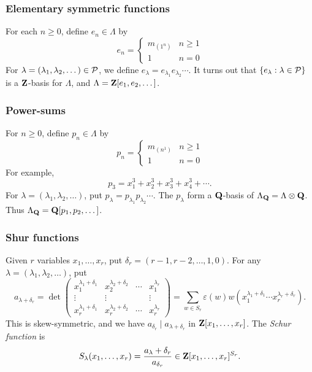 \subsubsection{Elementary symmetric functions}

For each $n\geqslant 0$, define $e_n\in \Lambda$ by 
\[
  e_n = \begin{cases} m_{(1^n)} & n\geqslant 1 \\ 1 & n=0 \end{cases} 
\] 
For $\lambda=(\lambda_1,\lambda_2,\dots)\in \mathcal{P}$, we define 
$e_\lambda = e_{\lambda_1} e_{\lambda_2} \cdots$. It turns out that 
$\{e_\lambda:\lambda\in \mathcal{P}\}$ is a $\mathbf{Z}$-basis for $\Lambda$, and 
$\Lambda=\mathbf{Z}[e_1,e_2,\dots]$. 


\subsubsection{Power-sums}

For $n\geqslant 0$, define $p_n\in \Lambda$ by 
\[
  p_n = \begin{cases} m_{(n^1)} & n\geqslant 1 \\ 1 & n=0 \end{cases}
\]
For example, 
\[
  p_3 = x_1^3 + x_2^3 + x_3^3 + x_4^3 + \cdots .
\]
For $\lambda=(\lambda_1,\lambda_2,\dots)$, put 
$p_\lambda = p_{\lambda_1} p_{\lambda_2} \dotsm$. The $p_\lambda$ form 
a $\mathbf{Q}$-basis of $\Lambda_{\mathbf{Q}} = \Lambda\otimes \mathbf{Q}$. Thus 
$\Lambda_{\mathbf{Q}}=\mathbf{Q}[p_1,p_2,\dots]$. 


\subsubsection{Shur functions}

Given $r$ variables $x_1,\dots,x_r$, put $\delta_r = (r-1,r-2,\dots,1,0)$. For 
any $\lambda=(\lambda_1,\lambda_2,\dots)$, put 
\[
  a_{\lambda+\delta_r} = \det
  \begin{pmatrix}
    x_1^{\lambda_1+\delta_1} & x_2^{\lambda_2 + \delta_2} & \cdots & x_1^{\lambda_r} \\ 
    \vdots & \vdots & & \vdots \\ 
    x_r^{\lambda_1 + \delta_1} & x_r^{\lambda_2 + \delta_2} & \cdots & x_r^{\lambda_r}  
  \end{pmatrix}
  = \sum_{w\in S_r} \varepsilon(w) w(x_1^{\lambda_1+\delta_1} \dotsm x_r^{\lambda_r+\delta_r}) .
\]
This is skew-symmetric, and we have $a_{\delta_r} \mid a_{\lambda+\delta_r}$ in 
$\mathbf{Z}[x_1,\dots,x_r]$. The \emph{Schur function} is 
\begin{equation}\label{eq:schur-poly}
  S_\lambda(x_1,\dots,x_r) = \frac{a_\lambda+\delta_r}{a_{\delta_r}} \in \mathbf{Z}[x_1,\dots,x_r]^{S_r} .
\end{equation}

